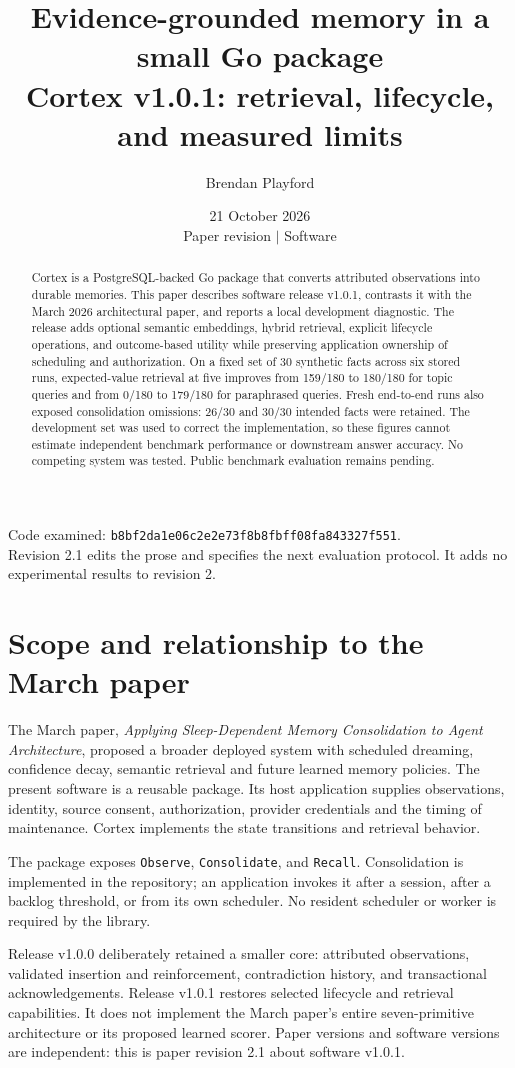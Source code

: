 \documentclass[11pt]{article}
\title{Evidence-grounded memory in a small Go package\\\large Cortex v1.0.1: retrieval, lifecycle, and measured limits}
\author{Brendan Playford}
\date{21 October 2026\\Paper revision \paperrevision{} $\mid$ Software \softwareversion}
\newcommand{\paperrevision}{2.1}
\newcommand{\softwareversion}{v1.0.1}
\newcommand{\codecommit}{b8bf2da1e06c2e2e73f8b8fbff08fa843327f551}
\begin{document}
\maketitle
{\small Code examined: \texttt{\codecommit}.\\
Revision 2.1 edits the prose and specifies the next evaluation protocol. It adds no experimental results to revision 2.}
\begin{abstract}
Cortex is a PostgreSQL-backed Go package that converts attributed observations into durable memories. This paper describes software release v1.0.1, contrasts it with the March 2026 architectural paper, and reports a local development diagnostic. The release adds optional semantic embeddings, hybrid retrieval, explicit lifecycle operations, and outcome-based utility while preserving application ownership of scheduling and authorization. On a fixed set of 30 synthetic facts across six stored runs, expected-value retrieval at five improves from 159/180 to 180/180 for topic queries and from 0/180 to 179/180 for paraphrased queries. Fresh end-to-end runs also exposed consolidation omissions: 26/30 and 30/30 intended facts were retained. The development set was used to correct the implementation, so these figures cannot estimate independent benchmark performance or downstream answer accuracy. No competing system was tested. Public benchmark evaluation remains pending.
\end{abstract}

\section{Scope and relationship to the March paper}
The March paper, \emph{Applying Sleep-Dependent Memory Consolidation to Agent Architecture}, proposed a broader deployed system with scheduled dreaming, confidence decay, semantic retrieval and future learned memory policies. The present software is a reusable package. Its host application supplies observations, identity, source consent, authorization, provider credentials and the timing of maintenance. Cortex implements the state transitions and retrieval behavior.

The package exposes \texttt{Observe}, \texttt{Consolidate}, and \texttt{Recall}. Consolidation is implemented in the repository; an application invokes it after a session, after a backlog threshold, or from its own scheduler. No resident scheduler or worker is required by the library.

Release v1.0.0 deliberately retained a smaller core: attributed observations, validated insertion and reinforcement, contradiction history, and transactional acknowledgements. Release v1.0.1 restores selected lifecycle and retrieval capabilities. It does not implement the March paper's entire seven-primitive architecture or its proposed learned scorer. Paper versions and software versions are independent: this is paper revision \paperrevision{} about software \softwareversion{}.
\end{document}
